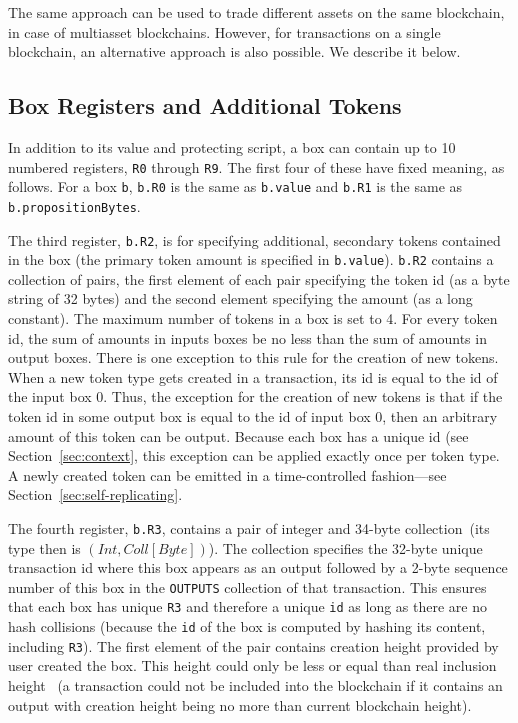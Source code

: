 \documentclass[11pt]{article}
\begin{document}
The same approach can be used to trade different assets on the same blockchain, in case of multiasset blockchains. However, for transactions on a single blockchain, an alternative approach is also possible. We describe it below.

\subsection{Box Registers and Additional Tokens}
\label{sec:box-registers}
In addition to its value and protecting script, a box can contain up to 10 numbered registers, \texttt{R0} through \texttt{R9}. The first four of these have fixed meaning, as follows. For a box \texttt{b}, \texttt{b.R0} is the same as \texttt{b.value} and \texttt{b.R1} is the same as \texttt{b.propositionBytes}. 


The third register, \texttt{b.R2}, is for specifying additional, secondary tokens contained in the box (the primary token amount is specified in \texttt{b.value}). \texttt{b.R2} contains a collection of pairs, the first element of each pair specifying the token id (as a byte string of 32 bytes) and the second element specifying the amount (as a long constant). The maximum number of tokens in a box is set to 4. For every token id, the sum of amounts in inputs boxes be no less than the sum of amounts in output boxes. There is one exception to this rule for the creation of new tokens. When a new token type gets created in a transaction, its id is equal to the id of the input box 0. Thus, the exception for the creation of new tokens is that if the token id in some output box is equal to the id of input box 0, then an arbitrary amount of this token can be output. Because each box has a unique id (see Section~\ref{sec:context}, this exception can be applied exactly once per token type. A newly created token can be emitted in a time-controlled fashion---see Section~\ref{sec:self-replicating}.

The fourth register, \texttt{b.R3}, contains a pair of integer and 34-byte collection~(its type then is $(Int, Coll[Byte])$). The collection specifies the 32-byte unique transaction id where this box appears as an output followed by a 2-byte sequence number of this box in the \texttt{OUTPUTS} collection of that transaction. This ensures that each box has unique \texttt{R3} and therefore a unique \texttt{id} as long as there are no hash collisions (because the \texttt{id} of the box is computed by hashing its content, including \texttt{R3}).
The first element of the pair contains creation height provided by user created the box. This height could only be less or equal than real inclusion height~
(a transaction could not be included into the blockchain if it contains an output with creation height being no more than current blockchain height).
\end{document}
